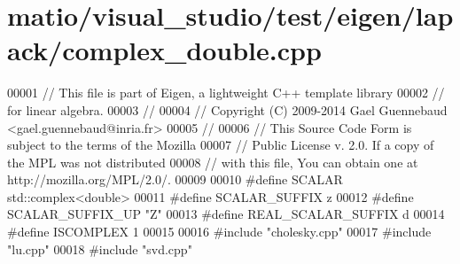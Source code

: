 \hypertarget{matio_2visual__studio_2test_2eigen_2lapack_2complex__double_8cpp_source}{}\section{matio/visual\+\_\+studio/test/eigen/lapack/complex\+\_\+double.cpp}
\label{matio_2visual__studio_2test_2eigen_2lapack_2complex__double_8cpp_source}

\begin{DoxyCode}
00001 \textcolor{comment}{// This file is part of Eigen, a lightweight C++ template library}
00002 \textcolor{comment}{// for linear algebra.}
00003 \textcolor{comment}{//}
00004 \textcolor{comment}{// Copyright (C) 2009-2014 Gael Guennebaud <gael.guennebaud@inria.fr>}
00005 \textcolor{comment}{//}
00006 \textcolor{comment}{// This Source Code Form is subject to the terms of the Mozilla}
00007 \textcolor{comment}{// Public License v. 2.0. If a copy of the MPL was not distributed}
00008 \textcolor{comment}{// with this file, You can obtain one at http://mozilla.org/MPL/2.0/.}
00009 
00010 \textcolor{preprocessor}{#define SCALAR        std::complex<double>}
00011 \textcolor{preprocessor}{#define SCALAR\_SUFFIX z}
00012 \textcolor{preprocessor}{#define SCALAR\_SUFFIX\_UP "Z"}
00013 \textcolor{preprocessor}{#define REAL\_SCALAR\_SUFFIX d}
00014 \textcolor{preprocessor}{#define ISCOMPLEX     1}
00015 
00016 \textcolor{preprocessor}{#include "cholesky.cpp"}
00017 \textcolor{preprocessor}{#include "lu.cpp"}
00018 \textcolor{preprocessor}{#include "svd.cpp"}
\end{DoxyCode}
